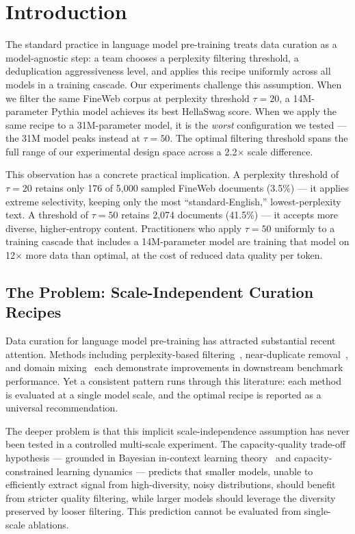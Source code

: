\section{Introduction}

The standard practice in language model pre-training treats data curation as a model-agnostic step: a team chooses a perplexity filtering threshold, a deduplication aggressiveness level, and applies this recipe uniformly across all models in a training cascade. Our experiments challenge this assumption. When we filter the same FineWeb corpus at perplexity threshold $\tau{=}20$, a 14M-parameter Pythia model achieves its best HellaSwag score. When we apply the same recipe to a 31M-parameter model, it is the \emph{worst} configuration we tested --- the 31M model peaks instead at $\tau{=}50$. The optimal filtering threshold spans the full range of our experimental design space across a 2.2$\times$ scale difference.

This observation has a concrete practical implication. A perplexity threshold of $\tau{=}20$ retains only 176 of 5,000 sampled FineWeb documents (3.5\%) --- it applies extreme selectivity, keeping only the most ``standard-English,'' lowest-perplexity text. A threshold of $\tau{=}50$ retains 2,074 documents (41.5\%) --- it accepts more diverse, higher-entropy content. Practitioners who apply $\tau{=}50$ uniformly to a training cascade that includes a 14M-parameter model are training that model on 12$\times$ more data than optimal, at the cost of reduced data quality per token.

\subsection{The Problem: Scale-Independent Curation Recipes}

Data curation for language model pre-training has attracted substantial recent attention. Methods including perplexity-based filtering~\cite{Zhou2024ProX,Peng2025DataMan}, near-duplicate removal~\cite{He2024SoftDedup,Penedo2025FineWeb2}, and domain mixing~\cite{Wettig2025Organize} each demonstrate improvements in downstream benchmark performance. Yet a consistent pattern runs through this literature: each method is evaluated at a single model scale, and the optimal recipe is reported as a universal recommendation.

The deeper problem is that this implicit scale-independence assumption has never been tested in a controlled multi-scale experiment. The capacity-quality trade-off hypothesis --- grounded in Bayesian in-context learning theory~\cite{Xie2021Explanation} and capacity-constrained learning dynamics --- predicts that smaller models, unable to efficiently extract signal from high-diversity, noisy distributions, should benefit from stricter quality filtering, while larger models should leverage the diversity preserved by looser filtering. This prediction cannot be evaluated from single-scale ablations.

